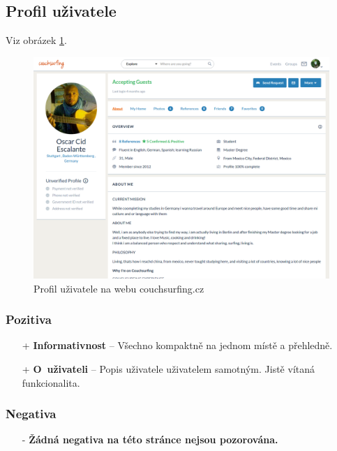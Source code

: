 
\newpage
\subsection{Profil uživatele}
Viz obrázek \ref{fig:couchsurfing:profile}.
\begin{figure}[h]
    \centering
    \includegraphics[width=1.0\textwidth]{media/couchsurfing/profile.png}
    \caption{Profil uživatele na webu couchsurfing.cz}
    \label{fig:couchsurfing:profile}
\end{figure}
\subsubsection*{Pozitiva}
\begin{itemize}
    \item[+] \textbf{Informativnost} -- Všechno kompaktně na jednom místě a přehledně.
    \item[+] \textbf{O~uživateli} -- Popis uživatele uživatelem samotným. Jistě vítaná funkcionalita.
\end{itemize}
\subsubsection*{Negativa}
\begin{itemize}
    \item[-] \textbf{Žádná negativa na této stránce nejsou pozorována.}
\end{itemize}


